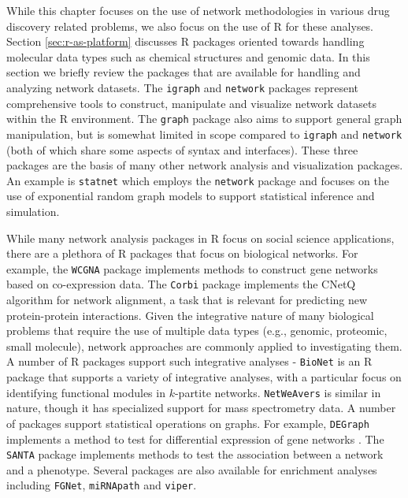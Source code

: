\documentclass[]{book}
\begin{document}
While this chapter focuses on the use of network methodologies in
various drug discovery related problems, we also focus on the use of R
for these analyses. Section \ref{sec:r-as-platform} discusses R
packages oriented towards handling molecular data types such as
chemical structures and genomic data. In this section we briefly
review the packages that are available for handling and analyzing
network datasets. The \texttt{igraph} \cite{Csardi:2006lp} and
\texttt{network} \cite{Butts:2008tp} packages represent comprehensive
tools to construct, manipulate and visualize network datasets within
the R environment. The \texttt{graph} package \cite{Gentleman:1wt}
also aims to support general graph manipulation, but is somewhat
limited in scope compared to \texttt{igraph} and \texttt{network}
(both of which share some aspects of syntax and interfaces). These
three packages are the basis of many other network analysis and visualization
packages. An example is \texttt{statnet} \cite{Handcock:2008il} which
employs the \texttt{network} package and focuses on the use of
exponential random graph models \cite{Robins:2007cr} to support
statistical inference and simulation. 

While many network analysis packages in R focus on social science
applications, there are a plethora of R packages that focus on
biological networks. For example, the \texttt{WCGNA} package
\cite{Langfelder:2008cj} implements methods to construct gene networks
based on co-expression data. The \texttt{Corbi} package \cite{Huang:2013sy}
implements the CNetQ algorithm for network alignment, a task that is
relevant for predicting new protein-protein interactions. Given the
integrative nature of many biological problems that require the use of
multiple data types (e.g., genomic, proteomic, small molecule),
network approaches are commonly applied to investigating them. A
number of R packages support such integrative analyses - \texttt{BioNet}
\cite{Beisser:2010xp} is an R package that supports a variety of
integrative analyses, with a particular focus on identifying
functional modules in $k$-partite networks. \texttt{NetWeAvers}
\cite{McClellan:2013zf} is similar in nature, though it has
specialized support for mass spectrometry data. A number of packages
support statistical operations on graphs. For example,
\texttt{DEGraph} implements a method to test for differential
expression of gene networks \cite{Jacob:2012yg}. The \texttt{SANTA}
package \cite{Cornish:2014vs} implements methods to test the
association between a network and a phenotype. Several packages are
also available for enrichment analyses including \texttt{FGNet},
\texttt{miRNApath} and \texttt{viper}.
\end{document}
